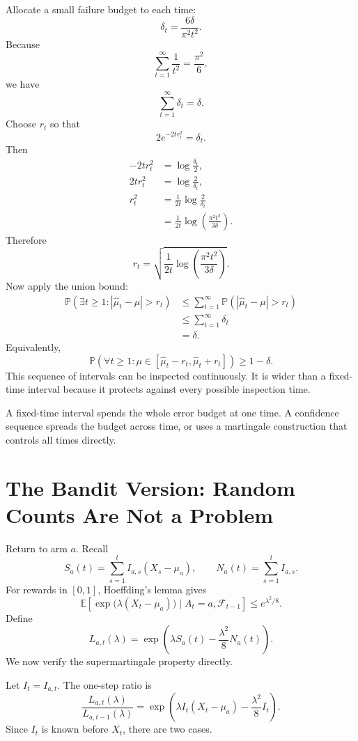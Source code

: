 \documentclass[en,nofont,11pt]{elegantbook}
\newcommand{\E}{\mathbb{E}}
\newcommand{\Pbb}{\mathbb{P}}
\newcommand{\F}{\mathcal{F}}
\begin{document}
Allocate a small failure budget to each time:
\[
\delta_t
=
\frac{6\delta}{\pi^2t^2}.
\]
Because
\[
\sum_{t=1}^{\infty}\frac1{t^2}=\frac{\pi^2}{6},
\]
we have
\[
\sum_{t=1}^{\infty}\delta_t=\delta.
\]
Choose $r_t$ so that
\[
2e^{-2tr_t^2}=\delta_t.
\]
Then
\begin{align*}
-2tr_t^2
&=\log\frac{\delta_t}{2},\\
2tr_t^2
&=\log\frac{2}{\delta_t},\\
r_t^2
&=\frac{1}{2t}\log\frac{2}{\delta_t}\\
&=\frac{1}{2t}
\log\left(
\frac{\pi^2t^2}{3\delta}
\right).
\end{align*}
Therefore
\[
\boxed{
r_t
=
\sqrt{
\frac{1}{2t}
\log\left(
\frac{\pi^2t^2}{3\delta}
\right)
}.
}
\]
Now apply the union bound:
\begin{align*}
\Pbb\left(
\exists t\ge1:
|\widehat\mu_t-\mu|>r_t
\right)
&\le
\sum_{t=1}^{\infty}
\Pbb\left(
|\widehat\mu_t-\mu|>r_t
\right)\\
&\le
\sum_{t=1}^{\infty}\delta_t\\
&=\delta.
\end{align*}
Equivalently,
\[
\boxed{
\Pbb\left(
\forall t\ge1:
\mu\in[\widehat\mu_t-r_t,\widehat\mu_t+r_t]
\right)
\ge1-\delta.
}
\]
This sequence of intervals can be inspected continuously. It is wider than a fixed-time interval because it protects against every possible inspection time.

\begin{keyidea}
A fixed-time interval spends the whole error budget at one time. A confidence sequence spreads the budget across time, or uses a martingale construction that controls all times directly.
\end{keyidea}

\chapter{The Bandit Version: Random Counts Are Not a Problem}

Return to arm $a$. Recall
\[
S_a(t)
=
\sum_{s=1}^{t}I_{a,s}(X_s-\mu_a),
\qquad
N_a(t)=\sum_{s=1}^{t}I_{a,s}.
\]
For rewards in $[0,1]$, Hoeffding's lemma gives
\[
\E\left[
\exp\bigl(\lambda(X_t-\mu_a)\bigr)
\mid A_t=a,\F_{t-1}
\right]
\le e^{\lambda^2/8}.
\]
Define
\[
L_{a,t}(\lambda)
=
\exp\left(
\lambda S_a(t)
-
\frac{\lambda^2}{8}N_a(t)
\right).
\]
We now verify the supermartingale property directly.

Let $I_t=I_{a,t}$. The one-step ratio is
\[
\frac{L_{a,t}(\lambda)}{L_{a,t-1}(\lambda)}
=
\exp\left(
\lambda I_t(X_t-\mu_a)
-
\frac{\lambda^2}{8}I_t
\right).
\]
Since $I_t$ is known before $X_t$, there are two cases.
\end{document}
